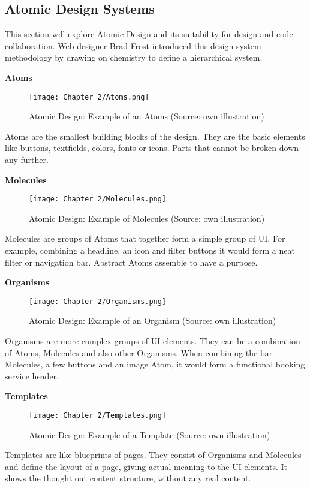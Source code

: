 \newpage
\subsection{Atomic Design Systems} \label{Atomic Design Systems}
This section will explore Atomic Design and its suitability for design and code collaboration. Web
designer Brad Frost introduced this design system methodology by drawing on chemistry to define a
hierarchical system.

\textbf{Atoms} \\
\begin{figure}[H]
	\centering
    \texttt{[image: Chapter 2/Atoms.png]}
    \caption{Atomic Design: Example of an Atoms (Source: own illustration)}
\end{figure}
Atoms are the smallest building blocks of the design. They are the basic elements like buttons,
textfields, colors, fonts or icons. Parts that cannot be broken down any further.

\textbf{Molecules} \\
\begin{figure}[H]
	\centering
    \texttt{[image: Chapter 2/Molecules.png]}
    \caption{Atomic Design: Example of Molecules (Source: own illustration)}
\end{figure}
Molecules are groups of Atoms that together form a simple group of UI. For example, combining
a headline, an icon and filter buttons it would form a neat filter or navigation bar. Abstract Atoms
assemble to have a purpose.  

\textbf{Organisms} \\
\begin{figure}[H]
	\centering
    \texttt{[image: Chapter 2/Organisms.png]}
    \caption{Atomic Design: Example of an Organism (Source: own illustration)}
\end{figure}
Organisms are more complex groups of UI elements. They can be a combination of Atoms, Molecules and
also other Organisms. When combining the bar Molecules, a few buttons and an image Atom, it would
form a functional booking service header. 

\textbf{Templates} \\
\begin{figure}[H]
	\centering
    \texttt{[image: Chapter 2/Templates.png]}
    \caption{Atomic Design: Example of a Template (Source: own illustration)}
\end{figure}
Templates are like blueprints of pages. They consist of Organisms and Molecules and define the
layout of a page, giving actual meaning to the UI elements. It shows the thought out content
structure, without any real content. 

